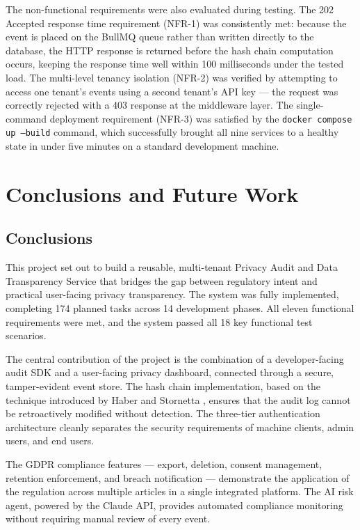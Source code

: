 \documentclass[a4paper,12pt,onecolumn]{report}
\begin{document}
The non-functional requirements were also evaluated during testing.
The 202 Accepted response time requirement (NFR-1) was consistently met: because the event is placed on the BullMQ queue rather than written directly to the database, the HTTP response is returned before the hash chain computation occurs, keeping the response time well within 100 milliseconds under the tested load.
The multi-level tenancy isolation (NFR-2) was verified by attempting to access one tenant's events using a second tenant's API key --- the request was correctly rejected with a 403 response at the middleware layer.
The single-command deployment requirement (NFR-3) was satisfied by the \texttt{docker compose up --build} command, which successfully brought all nine services to a healthy state in under five minutes on a standard development machine.


\chapter{Conclusions and Future Work}

\section{Conclusions}

This project set out to build a reusable, multi-tenant Privacy Audit and Data Transparency Service that bridges the gap between regulatory intent and practical user-facing privacy transparency.
The system was fully implemented, completing 174 planned tasks across 14 development phases.
All eleven functional requirements were met, and the system passed all 18 key functional test scenarios.

The central contribution of the project is the combination of a developer-facing audit SDK and a user-facing privacy dashboard, connected through a secure, tamper-evident event store.
The hash chain implementation, based on the technique introduced by Haber and Stornetta \cite{hashchain}, ensures that the audit log cannot be retroactively modified without detection.
The three-tier authentication architecture cleanly separates the security requirements of machine clients, admin users, and end users.

The GDPR compliance features --- export, deletion, consent management, retention enforcement, and breach notification --- demonstrate the application of the regulation across multiple articles in a single integrated platform.
The AI risk agent, powered by the Claude API, provides automated compliance monitoring without requiring manual review of every event.
\end{document}
